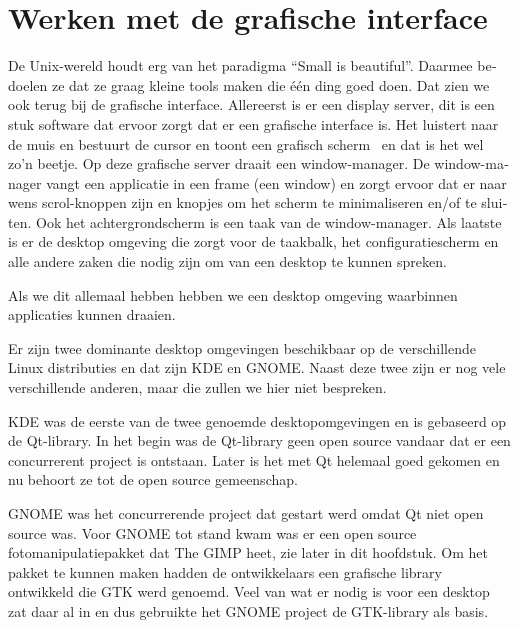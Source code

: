 \section[]{ }
\clearpage\section[Werken met de grafische interface]{\foreignlanguage{dutch}{Werken met de grafische interface}}
\hypertarget{RefHeadingToc24621698778599}{}{
\foreignlanguage{dutch}{De Unix-wereld houdt erg van het paradigma ``Small is beautiful''. Daarmee bedoelen ze dat ze
graag kleine tools maken die \'e\'en ding goed doen. Dat zien we ook terug bij de grafische interface. Allereerst is er
een display server, dit is een stuk software dat ervoor zorgt dat er een grafische interface is. Het luistert naar de
muis en bestuurt de cursor en toont een grafisch scherm \ en dat is het wel zo'n beetje. Op deze grafische server
draait een window-manager. De window-manager vangt een applicatie in een frame (een window) en zorgt ervoor dat er naar
wens scrol-knoppen zijn en knopjes om het scherm te minimaliseren en/of te sluiten. Ook het achtergrondscherm is een
taak van de window-manager. Als laatste is er de desktop omgeving die zorgt voor de taakbalk, het configuratiescherm en
alle andere zaken die nodig zijn om van een desktop te kunnen spreken.}}

{
Als we dit allemaal hebben hebben we een desktop omgeving waarbinnen applicaties kunnen draaien.}

{
Er zijn twee dominante desktop omgevingen beschikbaar op de verschillende Linux distributies en dat zijn KDE en GNOME.
Naast deze twee zijn er nog vele verschillende anderen, maar die zullen we hier niet bespreken.}

{
\foreignlanguage{dutch}{KDE was de eerste van de twee genoemde desktopomgevingen en is gebaseerd op de Qt-library. In
het begin was de Qt-library geen open source vandaar dat er een concurrerent project is ontstaan. Later is het met Qt
helemaal goed gekomen en nu behoort ze tot de open source gemeenschap.}}

{
GNOME was het concurrerende project dat gestart werd omdat Qt niet open source was. Voor GNOME tot stand kwam was er een
open source fotomanipulatiepakket dat The GIMP heet, zie later in dit hoofdstuk. Om het pakket te kunnen
maken hadden de ontwikkelaars een grafische library ontwikkeld die GTK werd genoemd. Veel van wat er nodig is voor een
desktop zat daar al in en dus gebruikte het GNOME project de GTK-library als basis.}

